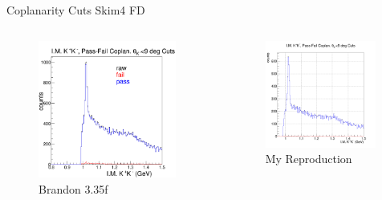 \documentclass[aspectratio=169]{beamer}
\begin{document}
\begin{frame}{Coplanarity Cuts \hfill Skim4 FD}
\vspace*{-0.6cm}
    \begin{columns}
    \begin{figure}
        \centering
        \includegraphics[width=0.94\textwidth]{brandon_figs/35f.png}
        \caption{Brandon 3.35f}
    \end{figure}
    \begin{figure}
        \centering
        \includegraphics[width=0.97\textwidth]{pdfs/35f.png}
        \caption{My Reproduction}
    \end{figure}
    \end{columns}
\end{frame}
\end{document}
